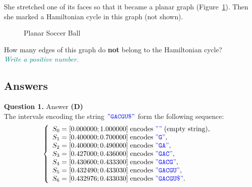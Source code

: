 \documentclass[jou]{apa6}
\begin{document}
She stretched one of its faces so that it became a planar graph
(Figure~\ref{fig:icosahedron2d}).
Then she marked a Hamiltonian cycle in this graph (not shown).


\begin{figure}[!htb]
\caption{\label{fig:icosahedron2d} Planar Soccer Ball}
\end{figure}

How many edges of this graph do {\bf not} belong to the Hamiltonian cycle?\\
\textcolor{teal}{\em Write a positive number.}


\mbox{}
\newpage

\subsection{Answers}

\vspace{4pt}
{\bf Question 1.} Answer {\bf (D)}\\
The intervals encoding the string $\textcolor{blue}{\mathtt{"GACGU\$"}}$
form the following sequence: 
$$\left\{ \begin{array}{l}
S_0 = [0.000000; 1.000000]\;\text{encodes}\;\textcolor{blue}{\mathtt{""}}\;\text{(empty string)}, \\
S_1 = [0.400000; 0.700000]\;\text{encodes}\;\textcolor{blue}{\mathtt{"G"}}, \\
S_2 = [0.400000; 0.490000]\;\text{encodes}\;\textcolor{blue}{\mathtt{"GA"}}, \\
S_3 = [0.427000; 0.436000]\;\text{encodes}\;\textcolor{blue}{\mathtt{"GAC"}}, \\
S_4 = [0.430600; 0.433300]\;\text{encodes}\;\textcolor{blue}{\mathtt{"GACG"}}, \\
S_5 = [0.432490; 0.433030]\;\text{encodes}\;\textcolor{blue}{\mathtt{"GACGU"}}, \\
S_6 = [0.432976; 0.433030]\;\text{encodes}\;\textcolor{blue}{\mathtt{"GACGU\$"}}. \\
\end{array} \right.$$
\end{document}
